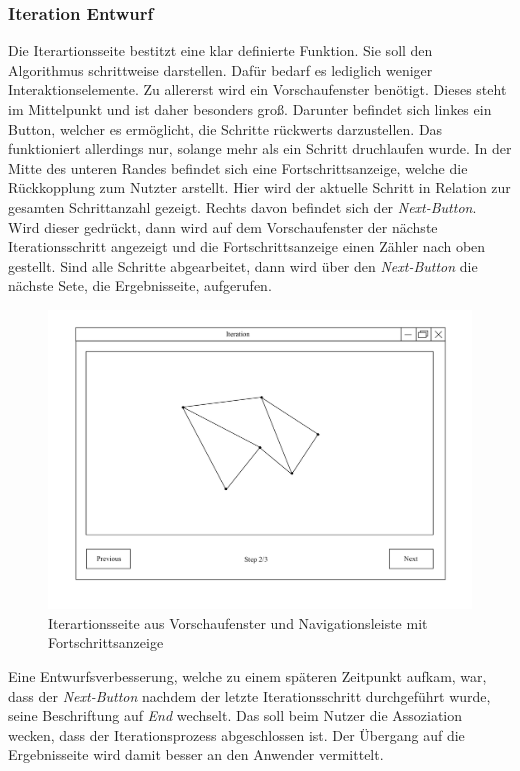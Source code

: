 \subsubsection{Iteration Entwurf}
Die Iterartionsseite bestitzt eine klar definierte Funktion. Sie soll den Algorithmus schrittweise darstellen. Dafür bedarf es lediglich weniger Interaktionselemente. 
Zu allererst wird ein Vorschaufenster benötigt. Dieses steht im Mittelpunkt und ist daher besonders groß. Darunter befindet sich linkes ein Button, welcher es ermöglicht, die Schritte rückwerts darzustellen. Das funktioniert allerdings nur,
solange mehr als ein Schritt druchlaufen wurde. In der Mitte des unteren Randes befindet sich eine Fortschrittsanzeige, welche die Rückkopplung zum Nutzter arstellt. Hier wird der aktuelle Schritt in Relation zur gesamten Schrittanzahl gezeigt.
Rechts davon befindet sich der \emph{Next-Button}. Wird dieser gedrückt, dann wird auf dem Vorschaufenster der nächste Iterationsschritt angezeigt und die Fortschrittsanzeige einen Zähler nach oben gestellt.
Sind alle Schritte abgearbeitet, dann wird über den \emph{Next-Button} die nächste Sete, die Ergebnisseite, aufgerufen.

\begin{figure}[h]
    \includegraphics[width=1\textwidth]{bilder/iteration.png}
    \caption[Entwurf Iterartionsseite]{Iterartionsseite aus Vorschaufenster und Navigationsleiste mit Fortschrittsanzeige}
    \label{fig:iteration}
\end{figure}

Eine Entwurfsverbesserung, welche zu einem späteren Zeitpunkt aufkam, war, dass der \emph{Next-Button} nachdem der letzte Iterationsschritt durchgeführt wurde, seine Beschriftung auf \emph{End} wechselt.
Das soll beim Nutzer die Assoziation wecken, dass der Iterationsprozess abgeschlossen ist. Der Übergang auf die Ergebnisseite wird damit besser an den Anwender vermittelt.

